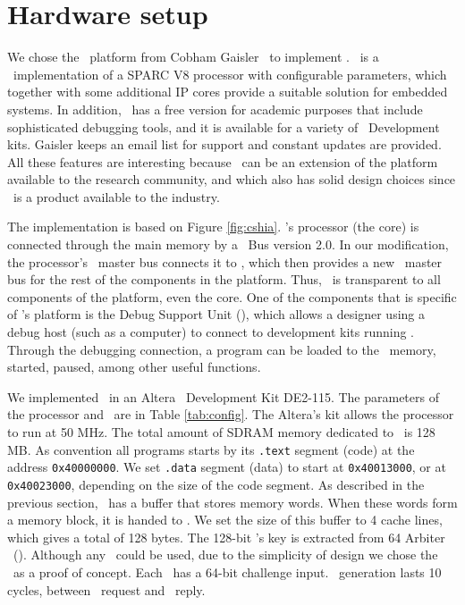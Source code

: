 

\section{Hardware setup}
\label{sec:hardware_setup}

We chose the \leon~platform from Cobham Gaisler~\cite{Leon} to implement \cshia. \leon~is a \vhdl~implementation of a SPARC V8 processor with configurable parameters, which together with some additional IP cores provide a suitable solution for embedded systems. In addition, \leon~has a free version for academic purposes that include sophisticated debugging tools, and it is available for a variety of \fpga~Development kits. Gaisler keeps an email list for support and constant updates are provided. All these features are interesting because \cshia~can be an extension of the platform available to the research community, and which also has solid design choices since \leon~is a product available to the industry.

The implementation is based on Figure \ref{fig:cshia}. \leon's processor (the core) is connected through the main memory by a \amba~Bus version 2.0. In our modification, the processor's \io~master bus connects it to \handler, which then provides a new \io~master bus for the rest of the components in the platform. Thus, \handler~is transparent to all components of the platform, even the core. One of the components that is specific of \leon's platform is the Debug Support Unit (\dsu), which allows a designer using a debug host (such as a computer) to connect to development kits running \leon. Through the debugging connection, a program can be loaded to the \fpga~memory, started, paused, among other useful functions.

We implemented \cshia~in an Altera \fpga~Development Kit DE2-115. The parameters of the processor and \cshia~are in Table \ref{tab:config}. The Altera's kit allows the processor to run at 50 MHz. The total amount of SDRAM memory dedicated to \leon~is 128 MB. As convention all programs starts by its \texttt{.text} segment (code) at the address \texttt{0x40000000}. We set \texttt{.data} segment (data) to start at \texttt{0x40013000}, or at \texttt{0x40023000}, depending on the size of the code segment. As described in the previous section, \handler~has a buffer that stores memory words. When these words form a memory block, it is handed to \seceng. We set the size of this buffer to 4 cache lines, which gives a total of 128 bytes. The 128-bit \siphash's key is extracted from 64 Arbiter \pufs~(\apufs). Although any \puf~could be used, due to the simplicity of design we chose the \apuf~as a proof of concept. Each \apuf~has a 64-bit challenge input. \ptag~generation lasts 10 cycles, between \seceng~request and \ptaggen~reply.

